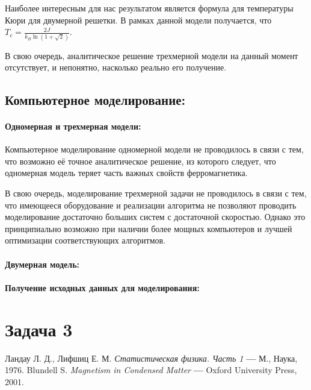 \documentclass[oneside,final,14pt]{extarticle}
\begin{document}
	Наиболее интересным для нас результатом является формула для температуры Кюри для двумерной решетки. В рамках данной модели получается, что $T_{c}=\frac{2J}{k_{B}\ln(1+\sqrt{2})}$. 

	В свою очередь, аналитическое решение трехмерной модели на данный момент отсутствует, и непонятно, насколько реально его получение. 
	\subsection{Компьютерное моделирование:}
	\paragraph{Одномерная и трехмерная модели:}
	Компьютерное моделирование одномерной модели не проводилось в связи с тем, что возможно её точное аналитическое решение, из которого следует, что одномерная модель теряет часть важных свойств ферромагнетика. 

	В свою очередь, моделирование трехмерной задачи не проводилось в связи с тем, что имеющееся оборудование и реализации алгоритма не позволяют проводить моделирование достаточно больших систем с достаточной скоростью. Однако это принципиально возможно при наличии более мощных компьютеров и лучшей оптимизации соответствующих алгоритмов. 
	\paragraph{Двумерная модель:}
	\paragraph{Получение исходных данных для моделирования:}	

	\newpage
	
	\section{Задача 3}
	
	\begin{thebibliography}{0}
		 Ландау Л. Д., Лифшиц Е. М. \textit{Статистическая физика. Часть 1} \textbf{---} М., Наука, 1976.
		 Blundell S. \textit{Magnetism in Condensed Matter} \textbf{---} Oxford University Press, 2001.
	\end{thebibliography}
\end{document}
